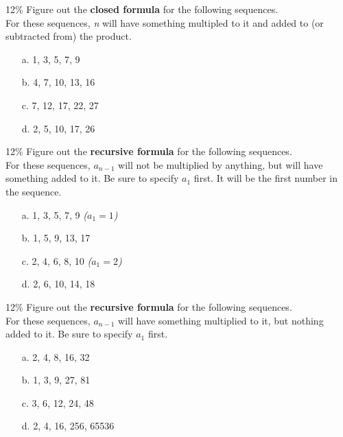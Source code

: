 \documentclass[a4paper,12pt]{book}
\begin{document}
        \begin{question}{5}{12\%}
            Figure out the \textbf{closed formula} for the following sequences. \\
            For these sequences, \textit{n} will have something multipled to it
            and added to (or subtracted from) the product.

            \begin{itemize}
                \item[a.] 1, 3, 5, 7, 9
                \item[b.] 4, 7, 10, 13, 16
                \item[c.] 7, 12, 17, 22, 27
                \item[d.] 2, 5, 10, 17, 26
            \end{itemize}
        \end{question}

        \newpage
        \begin{question}{6}{12\%}
            Figure out the \textbf{recursive formula} for the following sequences. \\
            For these sequences, $a_{n-1}$ will not be multiplied by anything,
            but will have something added to it.
            Be sure to specify $a_{1}$ first. It will be the first number in the sequence.

            \begin{itemize}
                \item[a.] 1, 3, 5, 7, 9     \tab \textit{($a_{1} = 1$)}
                \item[b.] 1, 5, 9, 13, 17
                \item[c.] 2, 4, 6, 8, 10    \tab \textit{($a_{1} = 2$)}
                \item[d.] 2, 6, 10, 14, 18
            \end{itemize}
        \end{question}

        \begin{question}{7}{12\%}
            Figure out the \textbf{recursive formula} for the following sequences. \\
            For these sequences, $a_{n-1}$ will have something multiplied to
            it, but nothing added to it.
            Be sure to specify $a_{1}$ first.

            \begin{itemize}
                \item[a.] 2, 4, 8, 16, 32
                \item[b.] 1, 3, 9, 27, 81
                \item[c.] 3, 6, 12, 24, 48
                \item[d.] 2, 4, 16, 256, 65536
            \end{itemize}
        \end{question}
        
\end{document}
